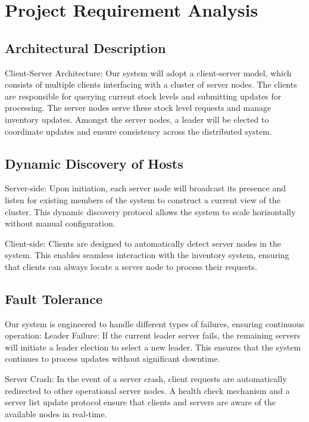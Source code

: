 \chapter{Project Requirement Analysis} \label{ch:ProjectRequirementAnalysis}
\section{Architectural Description} \label{sec:ArchitecturalDescription}
Client-Server Architecture: Our system will adopt a client-server model, which consists of multiple clients interfacing with a cluster of server nodes. The clients are responsible for querying current stock levels and submitting updates for processing. The server nodes serve these stock level requests and manage inventory updates. Amongst the server nodes, a leader will be elected to coordinate updates and ensure consistency across the distributed system.

\section{Dynamic Discovery of Hosts} \label{sec:DynamicDiscoveryOfHosts}
Server-side: Upon initiation, each server node will broadcast its presence and listen for existing members of the system to construct a current view of the cluster. This dynamic discovery protocol allows the system to scale horizontally without manual configuration.

Client-side: Clients are designed to automatically detect server nodes in the system. This enables seamless interaction with the inventory system, ensuring that clients can always locate a server node to process their requests.

\section{Fault Tolerance} \label{sec:FaultTolerance}
Our system is engineered to handle different types of failures, ensuring continuous operation:
Leader Failure: If the current leader server fails, the remaining servers will initiate a leader election to select a new leader. This ensures that the system continues to process updates without significant downtime.

Server Crash: In the event of a server crash, client requests are automatically redirected to other operational server nodes. A health check mechanism and a server list update protocol ensure that clients and servers are aware of the available nodes in real-time.

